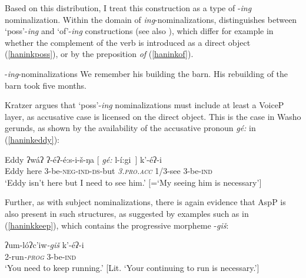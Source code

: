 \documentclass[output=paper]{langscibook}
\begin{document}
Based on this distribution, I treat this construction as a type of -{\itshape ing} nominalization. Within the domain of {\itshape ing}-nominalizations, \citet{kratzer1996} distinguishes between  `poss'-{\itshape ing} and `of'-{\itshape ing} constructions (see also \citealt{abney1987,alexiadou2005,harley2009}), which differ for example in whether the complement of the verb is introduced as a direct object (\ref{haninkposs}), or by the preposition {\itshape of} (\ref{haninkof}).
 

 \ea -\textit{ing}-nominalizations
 \ea  We remember his building the barn. \label{haninkposs} 
 \ex His rebuilding of the barn took five months. \label{haninkof} \hfill \citep[126--127]{kratzer1996}
 \z
 \z
 
Kratzer argues that `poss'-{\itshape ing} nominalizations must include at least a VoiceP layer, as accusative case is licensed on the direct object. This is the case in Washo gerunds, as shown by the availability of the accusative pronoun {\itshape gé:} in (\ref{haninkeddy}):
 
 
 \ea \gll Eddy ʔwáʔ ʔ-éʔ-é:s-i-š-ŋa $[$ {\itshape gé:} l-í:gi\ $]$ k'-éʔ-i\\
Eddy here 3-be-{\scshape neg-ind-ds}-but {} \textit{\textsc{3.pro.acc}} 1/3-see 3-be-{\scshape ind}\\
\glt `Eddy isn't here but I need to see him.' $[$=`My seeing him is necessary'$]$\label{haninkeddy}
\z 


Further, as with subject nominalizations, there is again evidence that AspP is also present in such structures, as suggested by examples such as in (\ref{haninkkeep}), which contains the progressive morpheme -{\itshape giš}:

\ea\gll ʔum-lóʔc'iw{\itshape-giš} k'-éʔ-i\\
2-run\textit{\textsc{-prog}} 3-be-{\scshape ind}\\
\glt `You need to keep running.' [Lit. `Your continuing to run is necessary.'] \label{haninkkeep}
\z
\end{document}
